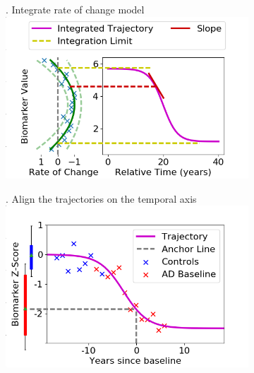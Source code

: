 \documentclass[10pt,xcolor=table]{beamer}
\begin{document}
\begin{frame}
\begin{figure}[H]
  \begin{subfigure}{0.47\textwidth}
    . Integrate rate of change model\\
    \vspace{0.7em}
    \includegraphics[scale=\figScale]{fig3_recon.png}
 \end{subfigure}
 \begin{subfigure}{0.47\textwidth}
     . Align the trajectories on the temporal axis
     \includegraphics[scale=\figScale]{fig4_align.png}
 \end{subfigure}
\end{figure}

\end{frame}
\end{document}
